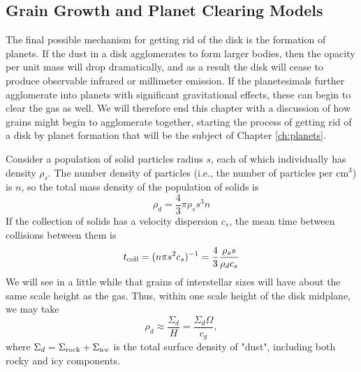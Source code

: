 \subsection{Grain Growth and Planet Clearing Models}

The final possible mechanism for getting rid of the disk is the formation of planets. If the dust in a disk agglomerates to form larger bodies, then the opacity per unit mass will drop dramatically, and as a result the disk will cease to produce observable infrared or millimeter emission. If the planetesimals further agglomerate into planets with significant gravitational effects, these can begin to clear the gas as well. We will therefore end this chapter with a discussion of how grains might begin to agglomerate together, starting the process of getting rid of a disk by planet formation that will be the subject of Chapter \ref{ch:planets}.

Consider a population of solid particles radius $s$, each of which individually has density $\rho_s$. The number density of particles (i.e., the number of particles per cm$^{3}$) is $n$, so the total mass density of the population of solids is
\begin{equation}
\rho_d = \frac{4}{3}\pi \rho_s s^3 n
\end{equation}
If the collection of solids has a velocity dispersion $c_s$, the mean time between collisions between them is
\begin{equation}
t_{\rm coll} = (n \pi s^2 c_s)^{-1} = \frac{4}{3} \frac{\rho_s s}{\rho_d c_s}
\end{equation}
We will see in a little while that grains of interstellar sizes will have about the same scale height as the gas. Thus, within one scale height of the disk midplane, we may take 
\begin{equation}
\rho_d \approx \frac{\Sigma_d}{H} = \frac{\Sigma_d \Omega}{c_g},
\end{equation}
where $\Sigma_d = \Sigma_{\rm rock} + \Sigma_{\rm ice}$ is the total surface density of "dust", including both rocky and icy components. 

